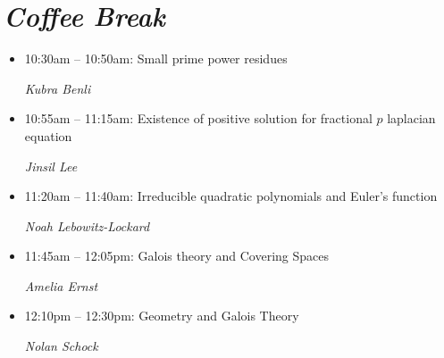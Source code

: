 \documentclass[oneside]{amsart}
\begin{document}
\section*{\textit{Coffee Break}}
\vspace{0.5em}
\begin{itemize}
\setlength\itemsep{1em}

\item 10:30am -- 10:50am: Small prime power residues \\ \vspace{-1.5em} \begin{flushright}\textit{ Kubra Benli }\end{flushright}
\item 10:55am -- 11:15am: Existence of positive solution for fractional $p$ laplacian equation \\ \vspace{-1.5em} \begin{flushright}\textit{ Jinsil Lee }\end{flushright}
\item 11:20am -- 11:40am: Irreducible quadratic polynomials and Euler's function \\ \vspace{-1.5em} \begin{flushright}\textit{ Noah Lebowitz-Lockard }\end{flushright}
\item 11:45am -- 12:05pm: Galois theory and Covering Spaces \\ \vspace{-1.5em} \begin{flushright}\textit{ Amelia Ernst }\end{flushright}
\item 12:10pm -- 12:30pm: Geometry and Galois Theory \\ \vspace{-1.5em} \begin{flushright}\textit{ Nolan Schock }\end{flushright}

\end{itemize}
\end{document}
